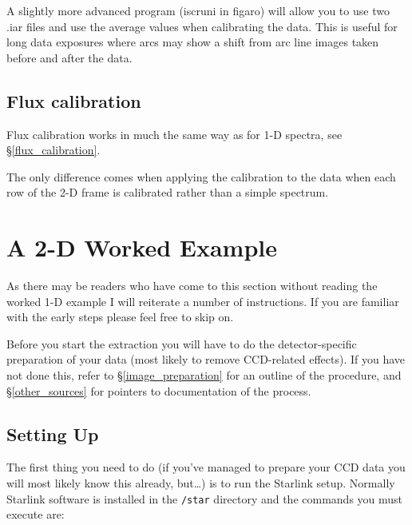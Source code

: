 \documentclass[twoside,11pt]{article}
\newcommand{\stardocinitials}  {SC}
\newcommand{\stardocnumber}    {7.2}
\newcommand{\stardocname}{\stardocinitials /\stardocnumber}
\newcommand{\htmlref}[2]{#1}
\newcommand{\xlabel}[1]{}
\newcommand{\mlabel}[1]{\xlabel{#1}\label{#1}}
\newcommand{\scspec}[2]{#1}
\newcommand{\scspec}[2]{#2}
\begin{document}
A slightly more advanced program (iscruni in figaro) will allow you to
use two .iar files and use the average values when calibrating the
data. This is useful for long data exposures where arcs may show a
shift from arc line images taken before and after the data.


\subsection{\mlabel{fluxcal_2d}Flux calibration}

Flux calibration works in much the same way as for 1-D spectra, see
\scspec{\S\ref{flux_calibration}}
{\htmlref{{\sl Flux Calibration \&
               Extinction Correction}}{flux_calibration}}.

The only difference comes when applying the calibration to the data
when each row of the 2-D frame is calibrated rather than a simple
spectrum.



\section{\mlabel{longslit_worked_example}A 2-D Worked Example}
\markboth{A 2-D Worked Example}{\stardocname}

As there may be readers who have come to this section without reading
the worked 1-D example I will reiterate a number of instructions. If
you are familiar with the early steps please feel free to skip on.

Before you start the extraction you will have to do the
detector-specific preparation of your data (most likely to remove
CCD-related effects).
If you have not done this, refer to \scspec{\S\ref{image_preparation}}
{\htmlref{Image Preparation}{image_preparation}} for an outline of the
procedure, and \scspec{\S\ref{other_sources}}
{\htmlref{Other Sources of Information}{other_sources}} for pointers
to documentation of the process.


\subsection{Setting Up}

The first thing you need to do (if you've managed to prepare your CCD
data you will most likely know this already, but\ldots ) is to run the
Starlink setup.
Normally Starlink software is installed in the \verb+/star+ directory
and the commands you must execute are:
\end{document}
